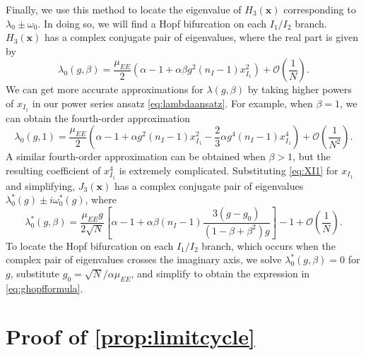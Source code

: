 \documentclass[reqno]{siamonline190516}
\newcommand{\xvec}{\mathbf{x}}
\begin{document}
Finally, we use this method to locate the eigenvalue of $H_3(\xvec)$ corresponding to $\lambda_0 \pm \omega_0$. In doing so, we will find a Hopf bifurcation on each $I_1/I_2$ branch. $H_3(\xvec)$ has a complex conjugate pair of eigenvalues, where the real part is given by
\begin{equation}
\lambda_0(g, \beta) = \frac{\mu_{EE}}{2}\left( \alpha - 1 + \alpha \beta g^2 (n_I-1) x_{I_1}^2 \right) + \mathcal{O}\left(\frac{1}{N} \right).
\end{equation}
We can get more accurate approximations for $\lambda(g, \beta)$ by taking higher powers of $x_{I_1}$ in our power series ansatz \cref{eq:lambdaansatz}. For example, when $\beta=1$, we can obtain the fourth-order approximation
\[
\lambda_0(g, 1) = \frac{\mu_{EE}}{2}\left( \alpha - 1 + \alpha g^2 (n_I-1) x_{I_1}^2 - \frac{2}{3}\alpha g^4 (n_I-1) x_{I_1}^4 \right) + \mathcal{O}\left(\frac{1}{N^2} \right).
\]
A similar fourth-order approximation can be obtained when $\beta>1$, but the resulting coefficient of $x_{I_1}^4$ is extremely complicated.
Substituting \cref{eq:XI1} for $x_{I_1}$ and simplifying, $J_3(\xvec)$ has a complex conjugate pair of eigenvalues $\lambda_0^*(g) \pm i \omega_0^*(g)$, where
\begin{equation}\label{eq:lambdagbeta}
\lambda_0^*(g, \beta) = \frac{\mu_{EE} g}{2 \sqrt{N}}\left[ \alpha - 1 + \alpha \beta (n_I-1) \frac{ 3(g - g_0) }{ (1 - \beta + \beta^2 )g} \right] - 1 + \mathcal{O}\left(\frac{1}{N} \right).
\end{equation}
To locate the Hopf bifurcation on each $I_1/I_2$ branch, which occurs when the complex pair of eigenvalues crosses the imaginary axis, we solve $\lambda_0^*(g, \beta) = 0$ for $g$, substitute $g_0 = \sqrt{N}/\alpha \mu_{EE}$, and simplify to obtain the expression in \cref{eq:ghopfformula}.

\section{Proof of \texorpdfstring{\cref{prop:limitcycle}}{Proposition}} \label{sec:limitcycleproof}
\end{document}
